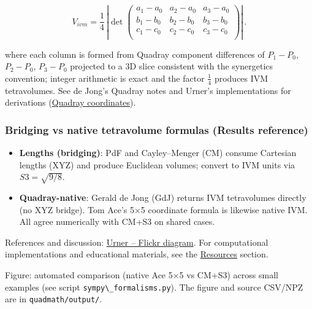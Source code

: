 \documentclass[
  10pt,
]{article}
\newcommand{\passthrough}[1]{#1}
\providecommand{\tightlist}{%
  \setlength{\itemsep}{0pt}\setlength{\parskip}{0pt}}
\begin{document}
\begin{itemize}
  \begin{equation}\label{eq:gdj}
  V_{ivm} = \frac{1}{4}\,\left|\det \begin{pmatrix}
  a_1-a_0 & a_2-a_0 & a_3-a_0 \\
  b_1-b_0 & b_2-b_0 & b_3-b_0 \\
  c_1-c_0 & c_2-c_0 & c_3-c_0 \\
  \end{pmatrix}\right|\,.
  \end{equation}

  where each column is formed from Quadray component differences of
  \(P_1-P_0\), \(P_2-P_0\), \(P_3-P_0\) projected to a 3D slice
  consistent with the synergetics convention; integer arithmetic is
  exact and the factor \(\tfrac{1}{4}\) produces IVM tetravolumes. See
  de Jong's Quadray notes and Urner's implementations for derivations
  (\href{https://en.wikipedia.org/wiki/Quadray_coordinates}{Quadray
  coordinates}).
\end{itemize}

\hypertarget{bridging-vs-native-tetravolume-formulas-results-reference}{%
\subsubsection{Bridging vs native tetravolume formulas (Results
reference)}\label{bridging-vs-native-tetravolume-formulas-results-reference}}

\begin{itemize}
\tightlist
\item
  \textbf{Lengths (bridging)}: PdF and Cayley--Menger (CM) consume
  Cartesian lengths (XYZ) and produce Euclidean volumes; convert to IVM
  units via \(S3 = \sqrt{9/8}\).
\item
  \textbf{Quadray-native}: Gerald de Jong (GdJ) returns IVM tetravolumes
  directly (no XYZ bridge). Tom Ace's 5×5 coordinate formula is likewise
  native IVM. All agree numerically with CM+S3 on shared cases.
\end{itemize}

References and discussion: \href{https://flic.kr/p/2rn22en}{Urner --
Flickr diagram}. For computational implementations and educational
materials, see the \href{07_resources.md}{Resources} section.

Figure: automated comparison (native Ace 5×5 vs CM+S3) across small
examples (see script \passthrough{\lstinline!sympy\_formalisms.py!}).
The figure and source CSV/NPZ are in
\passthrough{\lstinline!quadmath/output/!}.
\end{document}
